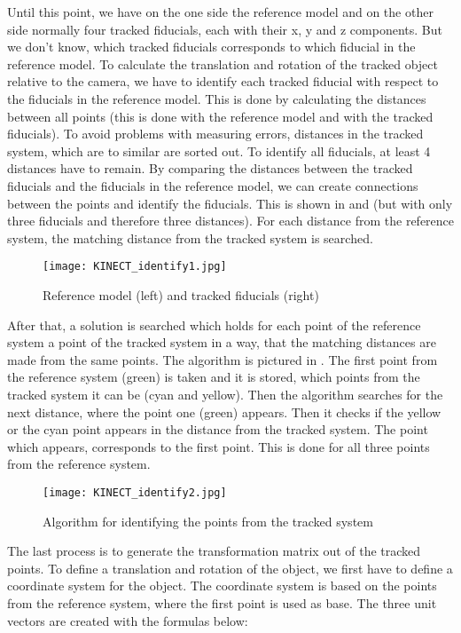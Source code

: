 Until this point, we have on the one side the reference model and on the other side normally four tracked fiducials, each with their x, y and z components. But we don’t know, which tracked fiducials corresponds to which fiducial in the reference model. To calculate the translation and rotation of the tracked object relative to the camera, we have to identify each tracked fiducial with respect to the fiducials in the reference model. 
This is done by calculating the distances between all points (this is done with the reference model and with the tracked fiducials). To avoid problems with measuring errors, distances in the tracked system, which are to similar are sorted out. To identify all fiducials, at least 4 distances have to remain. By comparing the distances between the tracked fiducials and the fiducials in the reference model, we can create connections between the points and identify the fiducials. This is shown in  and   (but with only three fiducials and therefore three distances). For each distance from the reference system, the matching distance from the tracked system is searched. 
\begin{figure}[!t]
\centering
\texttt{[image: KINECT\_identify1.jpg]}
\caption{Reference model (left) and tracked fiducials (right)}
\label{fig:KINECT_identify1}
\end{figure}
After that, a solution is searched which holds for each point of the reference system a point of the tracked system in a way, that the matching distances are made from the same points. The algorithm is pictured in  . The first point from the reference system (green) is taken and it is stored, which points from the tracked system it can be (cyan and yellow). Then the algorithm searches for the next distance, where the point one (green) appears. Then it checks if the yellow or the cyan point appears in the distance from the tracked system. The point which appears, corresponds to the first point. This is done for all three points from the reference system.
\begin{figure}[!b]
\centering
\texttt{[image: KINECT\_identify2.jpg]}
\caption{Algorithm for identifying the points from the tracked system}
\label{fig:KINECT_identify2}
\end{figure}
The last process is to generate the transformation matrix out of the tracked points. To define a translation and rotation of the object, we first have to define a coordinate system for the object. The coordinate system is based on the points from the reference system, where the first point is used as base. The three unit vectors are created with the formulas below:
